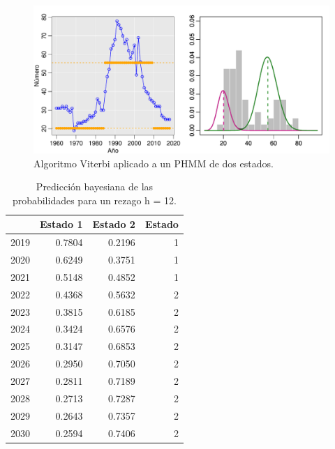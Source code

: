 \documentclass[a4paper]{article}\usepackage[]{graphicx}\usepackage[]{color}
\makeatletter
\def\maxwidth{ %
  \ifdim\Gin@nat@width>\linewidth
    \linewidth
  \else
    \Gin@nat@width
  \fi
}
\newenvironment{knitrout}{}{} %
\makeatother
\begin{document}
\begin{knitrout}
\color{fgcolor}\begin{figure}
\includegraphics[width=\maxwidth]{figure/unnamed-chunk-28-1} \caption[Algoritmo Viterbi aplicado a un PHMM de dos estados]{Algoritmo Viterbi aplicado a un PHMM de dos estados.}\label{fig:unnamed-chunk-28}
\end{figure}


\end{knitrout}

\begin{table}[ht]
\centering
\begin{tabular}{rrrr}
  \hline
 & Estado 1 & Estado 2 & Estado \\ 
  \hline
2019 & 0.7804 & 0.2196 &     1 \\ 
  2020 & 0.6249 & 0.3751 &     1 \\ 
  2021 & 0.5148 & 0.4852 &     1 \\ 
  2022 & 0.4368 & 0.5632 &     2 \\ 
  2023 & 0.3815 & 0.6185 &     2 \\ 
  2024 & 0.3424 & 0.6576 &     2 \\ 
  2025 & 0.3147 & 0.6853 &     2 \\ 
  2026 & 0.2950 & 0.7050 &     2 \\ 
  2027 & 0.2811 & 0.7189 &     2 \\ 
  2028 & 0.2713 & 0.7287 &     2 \\ 
  2029 & 0.2643 & 0.7357 &     2 \\ 
  2030 & 0.2594 & 0.7406 &     2 \\ 
   \hline
\end{tabular}
\caption{Predicción bayesiana de las probabilidades para un rezago h = 12.} 
\end{table}
\end{document}
